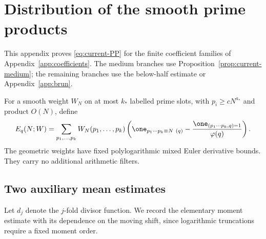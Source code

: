 \section{Distribution of the smooth prime products}
\label{app:prime-products}

This appendix proves \eqref{eq:current-PP} for the finite coefficient families of Appendix~\ref{app:coefficients}. The medium branches use Proposition~\ref{prop:current-medium}; the remaining branches use the below-half estimate or Appendix~\ref{app:brun}.

For a smooth weight $W_N$ on at most $k_*$ labelled prime slots, with
$p_i\ge cN^{a_*}$ and product $O(N)$, define
\[
 E_q(N;W)=\sum_{p_1,\ldots,p_k}W_N(p_1,\ldots,p_k)
 \left(\one_{p_1\cdots p_k\equiv N\ (q)}
       -\frac{\one_{(p_1\cdots p_k,q)=1}}{\varphi(q)}\right).
\]
The geometric weights have fixed polylogarithmic mixed Euler derivative
bounds.  They carry no additional arithmetic filters.

\subsection{Two auxiliary mean estimates}

Let $d_j$ denote the $j$-fold divisor function.
We record the elementary moment estimate with its dependence on the
moving shift, since logarithmic truncations require a fixed moment order.

